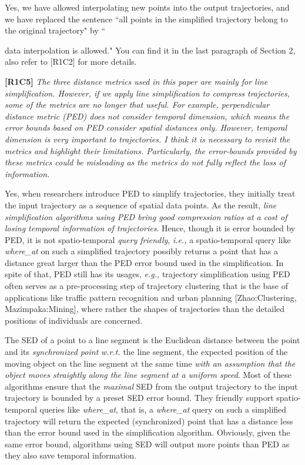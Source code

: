 \documentclass{letter}
\newcommand{\ie}{\emph{i.e.,}\xspace}
\newcommand{\eg}{\emph{e.g.,}\xspace}
\newcommand{\wrt}{\emph{w.r.t.}\xspace}
\begin{document}
Yes, we have allowed interpolating new points into the output trajectories, and we have replaced the sentence ``all points in the simplified trajectory belong to the original trajectory" by ``{data interpolation is allowed." You can find it in the last paragraph of Section 2, also refer to [R1C2] for more details. 


\textbf{[R1C5]} \emph{The three distance metrics used in this paper are mainly for line simplification. However, if we apply line simplification to compress trajectories, some of the metrics are no longer that useful. For example, perpendicular distance metric (PED) does not consider temporal dimension, which means the error bounds based on PED consider spatial distances only. However, temporal dimension is very important to trajectories. I think it is necessary to revisit the metrics and highlight their limitations. Particularly, the error-bounds provided by these metrics could be misleading as the metrics do not fully reflect the loss of information. }

Yes, when researchers introduce PED to simplify trajectories, they initially treat the input trajectory as a sequence of spatial data points. As the result, \emph{line simplification algorithms using PED bring good compression ratios at a cost of losing temporal information of trajectories}. Hence, though it is error bounded by PED, it is not spatio-temporal \emph{query friendly}, \ie a spatio-temporal query like \emph{where\_at} on such a simplified trajectory possibly returns a point that has a distance great larger than the PED error bound used in the simplification. 
{In spite of that, PED still has its usages, \eg trajectory simplification using PED often serves as a pre-processing step of trajectory clustering that is the base of applications like traffic pattern recognition and urban planning [Zhao:Clustering, Mazimpaka:Mining], where rather the shapes of trajectories than the detailed positions of individuals are concerned.}

The SED of a point to a line segment is the Euclidean distance between the point and its \emph{synchronized point} \wrt the line segment, the expected position of the moving object on the line segment at the same time \emph{with an assumption that the object moves straightly along the line segment at a uniform speed}. {Most of these algorithms ensure that the \emph{maximal} SED from the output trajectory to the input trajectory is bounded by a preset SED error bound.} 
They friendly support spatio-temporal queries like \emph{where\_at}, that is, a \emph{where\_at} query on such a simplified trajectory will return the expected (synchronized) point that has a distance less than the error bound used in the simplification algorithm.
{Obviously, given the same error bound, algorithms using SED will output more points than PED as they also save temporal information.}

}
\end{document}
